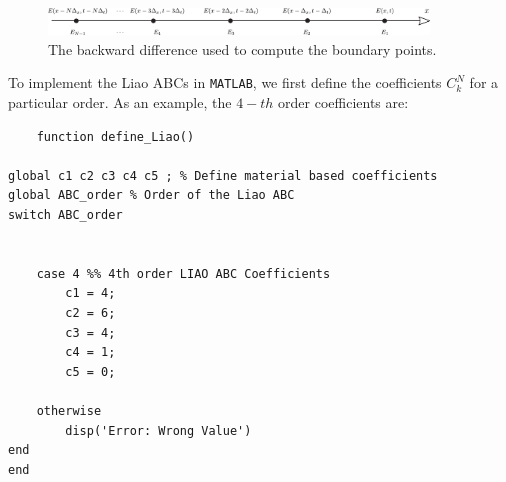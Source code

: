 \documentclass[11pt]{article}
\begin{document}
\begin{figure}[t!]
  \centering
  \includegraphics[width=0.9\textwidth]{backward difference.pdf}
  \caption{The backward difference used to compute the boundary points.}
  \label{fig:backward_difference}
\end{figure}

To implement the Liao ABCs in \texttt{MATLAB}, we first define the coefficients $C_k^N$ for a particular order. As an example, the $4-th$ order coefficients are:

\begin{mdframed}[backgroundcolor=gray!20]
  \scriptsize
  \begin{verbatim}
    function define_Liao()

global c1 c2 c3 c4 c5 ; % Define material based coefficients
global ABC_order % Order of the Liao ABC 
switch ABC_order
  
        
    case 4 %% 4th order LIAO ABC Coefficients
        c1 = 4;
        c2 = 6;
        c3 = 4;
        c4 = 1;
        c5 = 0;
        
    otherwise
        disp('Error: Wrong Value')
end
end
  \end{verbatim}
\end{mdframed}
\end{document}

